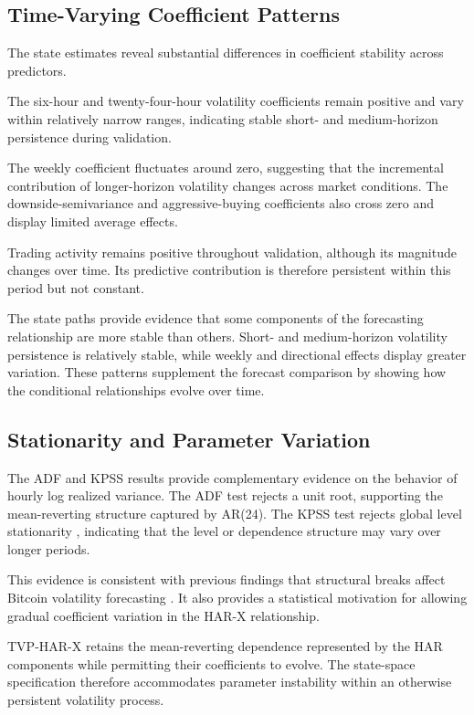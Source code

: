 \subsection{Time-Varying Coefficient Patterns}

The state estimates reveal substantial differences in
coefficient stability across predictors.

The six-hour and twenty-four-hour volatility coefficients
remain positive and vary within relatively narrow ranges,
indicating stable short- and medium-horizon persistence during
validation.

The weekly coefficient fluctuates around zero, suggesting that
the incremental contribution of longer-horizon volatility
changes across market conditions. The downside-semivariance
and aggressive-buying coefficients also cross zero and display
limited average effects.

Trading activity remains positive throughout validation,
although its magnitude changes over time. Its predictive
contribution is therefore persistent within this period but
not constant.

The state paths provide evidence that some components of the
forecasting relationship are more stable than others.
Short- and medium-horizon volatility persistence is relatively
stable, while weekly and directional effects display greater
variation. These patterns supplement the forecast comparison
by showing how the conditional relationships evolve over time.

\subsection{Stationarity and Parameter Variation}

The ADF and KPSS results provide complementary evidence on the
behavior of hourly log realized variance. The ADF test rejects
a unit root, supporting the mean-reverting structure captured
by AR(24). The KPSS test rejects global level stationarity
\citep{kpss1992}, indicating that the level or dependence
structure may vary over longer periods.

This evidence is consistent with previous findings that
structural breaks affect Bitcoin volatility forecasting
\citep{shen2020}. It also provides a statistical motivation
for allowing gradual coefficient variation in the HAR-X
relationship.

TVP-HAR-X retains the mean-reverting dependence represented by
the HAR components while permitting their coefficients to
evolve. The state-space specification therefore accommodates
parameter instability within an otherwise persistent
volatility process.

